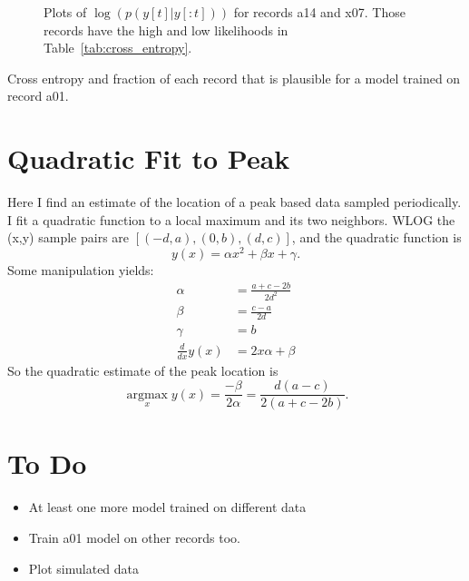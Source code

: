 \documentclass[12pt]{article}
\newcommand{\argmax}{\operatorname*{argmax}}
\begin{document}
\begin{figure}
  \centering
  \caption{Plots of $\log\left(p(y[t]|y[:t]) \right)$ for records a14
    and x07.  Those records have the high and low likelihoods in
    Table~\ref{tab:cross_entropy}.}
  \label{fig:likelihood}
\end{figure}

\begin{table}
  \centering
    
  \caption[Cross Entropy]{Cross entropy and fraction of each record
    that is plausible for a model trained on record a01.}
  \label{tab:cross_entropy}
\end{table}

\section{Quadratic Fit to Peak}
\label{sec:quadratic}

Here I find an estimate of the location of a peak based data sampled
periodically.  I fit a quadratic function to a local maximum and its
two neighbors.  WLOG the (x,y) sample pairs are $[(-d,a), (0,b),
(d,c)]$, and the quadratic function is
\begin{equation*}
  y(x) = \alpha x^2 + \beta x + \gamma.
\end{equation*}
Some manipulation yields:
\begin{align*}
  \alpha &= \frac{a+c-2b}{2d^2} \\
  \beta &= \frac{c-a}{2d} \\
  \gamma &= b \\
  \frac{d}{dx} y(x) &= 2x\alpha + \beta
\end{align*}
So the quadratic estimate of the peak location is
\begin{equation*}
  \argmax_x y(x) = \frac{-\beta}{2\alpha} = \frac{d(a-c)}{2(a+c-2b)}.
\end{equation*}

\section{To Do}
\label{sec:todo}

\begin{itemize}
\item At least one more model trained on different data
\item Train a01 model on other records too.
\item Plot simulated data
\end{itemize}
\end{document}
